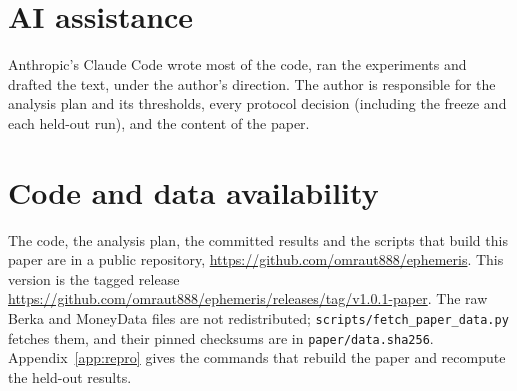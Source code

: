 \section*{AI assistance}
\label{sec:statements}
Anthropic's Claude Code wrote most of the code, ran the experiments and
drafted the text, under the author's direction. The author is responsible
for the analysis plan and its thresholds, every protocol decision
(including the freeze and each held-out run), and the content of the
paper.

\section*{Code and data availability}
The code, the analysis plan, the committed results and the scripts that
build this paper are in a public repository,
\url{https://github.com/omraut888/ephemeris}. This version is the tagged
release \url{https://github.com/omraut888/ephemeris/releases/tag/v1.0.1-paper}.
The raw Berka and MoneyData files are not redistributed;
\texttt{scripts/fetch\_paper\_data.py} fetches them, and their pinned
checksums are in \texttt{paper/data.sha256}. Appendix~\ref{app:repro}
gives the commands that rebuild the paper and recompute the held-out
results.
